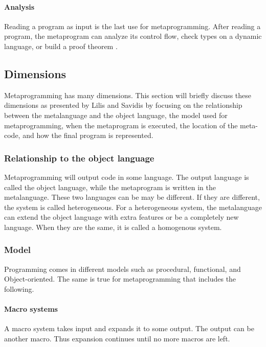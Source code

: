 \paragraph{Analysis}
Reading a program as input is the last use for metaprogramming.
After reading a program, the metaprogram can analyze its control flow, check types on a dynamic language, or build a proof theorem \cite{sheard_01_01}.

\subsection{Dimensions}
Metaprogramming has many dimensions.
This section will briefly discuss these dimensions as presented by Lilis and Savidis \cite{savidis_19_01} by focusing on the relationship between the metalanguage and the object language, the model used for metaprogramming, when the metaprogram is executed, the location of the meta-code, and how the final program is represented.

\subsubsection{Relationship to the object language}
Metaprogramming will output code in some language.
The output language is called the object language, while the metaprogram is written in the metalanguage.
These two languages can be may be different.
If they are different, the system is called heterogeneous.
For a heterogeneous system, the metalanguage can extend the object language with extra features or be a completely new language.
When they are the same, it is called a homogenous system. \cite{sheard_01_01}


\subsubsection{Model}
Programming comes in different models such as procedural, functional, and Object-oriented.
The same is true for metaprogramming that includes the following.

\paragraph{Macro systems}
A macro system takes input and expands it to some output.
The output can be another macro.
Thus expansion continues until no more macros are left.

